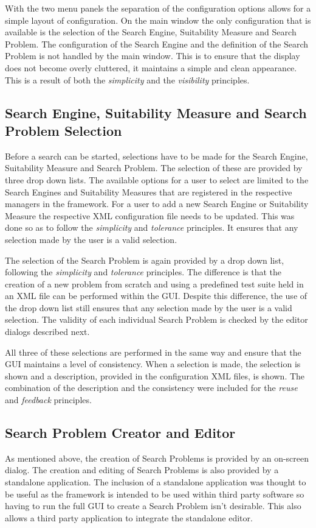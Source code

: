 With the two menu panels the separation of the configuration options allows for a simple layout of configuration.
On the main window the only configuration that is available is the selection of the Search Engine, Suitability Measure and Search Problem.
The configuration of the Search Engine and the definition of the Search Problem is not handled by the main window.
This is to ensure that the display does not become overly cluttered, it maintains a simple and clean appearance.
This is a result of both the \emph{simplicity} and the \emph{visibility} principles.

\subsection{Search Engine, Suitability Measure and Search Problem Selection}

Before a search can be started, selections have to be made for the Search Engine, Suitability Measure and Search Problem.
The selection of these are provided by three drop down lists.
The available options for a user to select are limited to the Search Engines and Suitability Measures that are registered in the respective managers in the framework.
For a user to add a new Search Engine or Suitability Measure the respective XML configuration file needs to be updated.
This was done so as to follow the \emph{simplicity} and \emph{tolerance} principles.
It ensures that any selection made by the user is a valid selection.

The selection of the Search Problem is again provided by a drop down list, following the \emph{simplicity} and \emph{tolerance} principles.
The difference is that the creation of a new problem from scratch and using a predefined test suite held in an XML file can be performed within the GUI.
Despite this difference, the use of the drop down list still ensures that any selection made by the user is a valid selection.
The validity of each individual Search Problem is checked by the editor dialogs described next.

All three of these selections are performed in the same way and ensure that the GUI maintains a level of consistency.
When a selection is made, the selection is shown and a description, provided in the configuration XML files, is shown.
The combination of the description and the consistency were included for the \emph{reuse} and \emph{feedback} principles.

\subsection{Search Problem Creator and Editor}
As mentioned above, the creation of Search Problems is provided by an on-screen dialog.
The creation and editing of Search Problems is also provided by a standalone application.
The inclusion of a standalone application was thought to be useful as the framework is intended to be used within third party software so having to run the full GUI to create a Search Problem isn't desirable.
This also allows a third party application to integrate the standalone editor.

